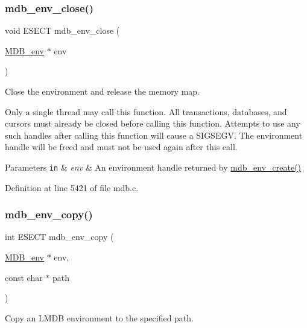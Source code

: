 \subsubsection{\texorpdfstring{mdb\+\_\+env\+\_\+close()}{mdb\_env\_close()}}
{\footnotesize\ttfamily void E\+S\+E\+CT mdb\+\_\+env\+\_\+close (\begin{DoxyParamCaption}\item[{\mbox{\hyperlink{struct_m_d_b__env}{M\+D\+B\+\_\+env}} $\ast$}]{env }\end{DoxyParamCaption})}



Close the environment and release the memory map. 

Only a single thread may call this function. All transactions, databases, and cursors must already be closed before calling this function. Attempts to use any such handles after calling this function will cause a S\+I\+G\+S\+E\+GV. The environment handle will be freed and must not be used again after this call. 
\begin{DoxyParams}[1]{Parameters}
\mbox{\tt in}  & {\em env} & An environment handle returned by \mbox{\hyperlink{group__mdb_gaad6be3d8dcd4ea01f8df436f41d158d4}{mdb\+\_\+env\+\_\+create()}} \\
\hline
\end{DoxyParams}


Definition at line 5421 of file mdb.\+c.

\mbox{\label{group__internal_gaf313ff244a6a612e499a7aa92e078002}} 
\subsubsection{\texorpdfstring{mdb\+\_\+env\+\_\+copy()}{mdb\_env\_copy()}}
{\footnotesize\ttfamily int E\+S\+E\+CT mdb\+\_\+env\+\_\+copy (\begin{DoxyParamCaption}\item[{\mbox{\hyperlink{struct_m_d_b__env}{M\+D\+B\+\_\+env}} $\ast$}]{env,  }\item[{const char $\ast$}]{path }\end{DoxyParamCaption})}



Copy an L\+M\+DB environment to the specified path. 

